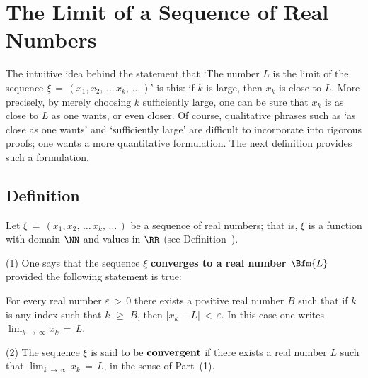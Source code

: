 \V
\V

                \section{{\bf The Limit of a Sequence of Real Numbers}}
                \label{SectC10}

\V
\V

        The intuitive idea behind the statement that `The number $L$ is the limit  of the sequence ${\xi} \,=\, (x_{1},x_{2},\,{\ldots}\,x_{k},\,{\ldots}\,)$' is this:
    if $k$ is large, then $x_{k}$ is close to $L$. More precisely, by merely choosing $k$ sufficiently large, one can be sure that $x_{k}$ is as close to $L$ as one wants, or even closer.
    Of course, qualitative phrases such as `as close as one wants' and `sufficiently large' are difficult to incorporate into rigorous proofs; one wants a more quantitative formulation.
    The next definition provides such a formulation.

\V
\V

            \subsection{\small{\bf Definition}}
            \label{DefC10.10}

\V 

        Let ${\xi} \,=\, (x_{1},x_{2},\,{\ldots}\,x_{k},\,{\ldots}\,)$ be a sequence of real numbers;
    that is, ${\xi}$ is a function with domain ${\NN}$ and values in ${\RR}$ (see Definition~).

\V

        (1) One says that the sequence ${\xi}$ {\bf converges to a real number $\Bfm{L}$} provided the following statement is true:

        For every real number ${\varepsilon}\,>\,0$ there exists a positive real number $B$ such that if $k$ is any index such that $k\,\,{\geq}\,\,B$, then $|x_{k}-L|\,<\,{\varepsilon}$.
    In this case one writes $\lim_{k \,{\rightarrow}\, {\infty}} x_{k} \,=\, L$.

\V

        (2) The sequence ${\xi}$ is said to be ${\bf convergent}$
    if there exists a real number $L$ such that $\lim_{k \,{\rightarrow}\, {\infty}} x_{k} \,=\, L$, in the sense of Part~(1).

